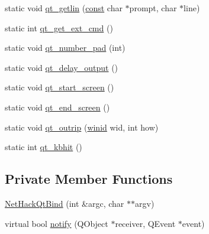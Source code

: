 \begin{DoxyCompactItemize}
\item 
static void \hyperlink{classNetHackQtBind_ae8267c5bf7a1aa3f2c86c491e3e9dc7f}{qt\+\_\+getlin} (\hyperlink{tradstdc_8h_a2c212835823e3c54a8ab6d95c652660e}{const} char $\ast$prompt, char $\ast$line)
\item 
static int \hyperlink{classNetHackQtBind_ab8aa17ccc4b808bbbcd84c49e4c992b3}{qt\+\_\+get\+\_\+ext\+\_\+cmd} ()
\item 
static void \hyperlink{classNetHackQtBind_a48cea27dcff3cc6a8d68ff0b36142f8a}{qt\+\_\+number\+\_\+pad} (int)
\item 
static void \hyperlink{classNetHackQtBind_ae7a6c84ee0c39014d70b731ed72680c8}{qt\+\_\+delay\+\_\+output} ()
\item 
static void \hyperlink{classNetHackQtBind_a70e4ee465fbf42d1329ef25b3d1104b6}{qt\+\_\+start\+\_\+screen} ()
\item 
static void \hyperlink{classNetHackQtBind_a2f1a77433b97a2f9e1df0f4b140ac5e3}{qt\+\_\+end\+\_\+screen} ()
\item 
static void \hyperlink{classNetHackQtBind_a584cbe4ba3e4eba12606d20c61f9b33c}{qt\+\_\+outrip} (\hyperlink{wintype_8h_adc2de956a3f084b1691cf080e1d1412b}{winid} wid, int how)
\item 
static int \hyperlink{classNetHackQtBind_a7aa3e3824e8824406d71e76c4a80780c}{qt\+\_\+kbhit} ()
\end{DoxyCompactItemize}
\subsection*{Private Member Functions}
\begin{DoxyCompactItemize}
\item 
\hyperlink{classNetHackQtBind_a8645a48b3bb3ec1902dbf58180f3ea9a}{Net\+Hack\+Qt\+Bind} (int \&argc, char $\ast$$\ast$argv)
\item 
virtual bool \hyperlink{classNetHackQtBind_aea49859e944cc3b322cab21bd9cbf791}{notify} (Q\+Object $\ast$receiver, Q\+Event $\ast$event)
\end{DoxyCompactItemize}
